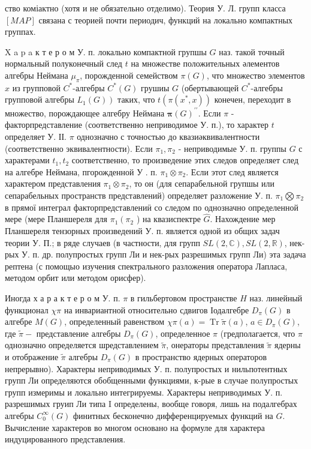 \documentclass[10pt]{article}
\begin{document}
ство коміактно (хотя и не обязательно отделимо). Теория У. Л. групп класса $[M A P]$ связана с теорией почти периодич, функций на локально компактных группах.



$\mathrm{X}$ a p a к т е р о м У. п. локально компактной групшы $G$ наз. такой точный нормальный полуконечный след $t$ на множестве положительных әлементов алгебры Неймана $\mu_{\pi}$, порожденной семейством $\pi(G)$, что множество элементов $x$ из групповой $C^{*}$-алгебры $C^{*}(G)$ грушиы $G$ (обертывающей $C^{*}$-алгебры групповой алгебры $\left.L_{1}(G)\right)$ таких, что $t\left(\pi\left(x^{*}, x\right)\right)$ конечен, переходит в множество, порождающее алгебру Неймана $\boldsymbol{\pi}(G)^{\prime \prime}$. Если $\pi$ - факторпредставление (соответственно неприводимое У. п.), то характер $t$ определяет У. ІІ. $\pi$ однозначно с точностью до квазиәквивалентности (соответственно эквивалентности). Если $\pi_{1}, \pi_{2}$ - неприводимые У. п. группы $G$ с характерами $t_{1}, t_{2}$ соответственно, то произведение этих следов определяет след на алгебре Неймана, пгорожденной У . п. $\pi_{1} \otimes \pi_{2}$. Если этот след является характером представления $\pi_{1} \otimes \pi_{2}$, то он (для сепарабельной групшы или сепарабельных пространств представлений) определяет разложение У. п. $\pi_{1} \bigotimes \pi_{2}$ в прямої интеграл факторпредставлениӥ со следом по однозначно определенной мере (мере Планшереля для $\pi_{1}\left(\pi_{2}\right.$ ) на квазиспектре $\hat{G}$. Нахождение мер Планшереля тензорных произведений У. п. является одной из общих задач теории У. П.; в ряде случаев (в частности, для групп $S L(2, \mathbb{C}), S L(2, \mathbb{R})$, нек-рых У. п. др. полупростых групп Ли и нек-рых разрешимых групп Ли) эта задача рептена (с помощыо изучения спектрального разложения оператора Лапласа, методом орбит или методом орисфер).



Иногда х а р а к т е р о м У. п. $\pi$ в гильбертовом пространстве $H$ наз. линейный функционал $\chi \pi$ на инвариантной относительно сдвигов Іодалгебре $D_{\pi}(G)$ в алгебре $M(G)$, определенный равенством $\chi \pi(a)=\operatorname{Tr} \tilde{\pi}(a)$, $a \in D_{\pi}(G)$, где $\tilde{\pi}-$ представление алгебры $D_{\pi}(G)$, определенное $\pi$ (гредполагается, что $\pi$ однозначно определяется шредставлением $\tilde{\pi}$, онераторы представления $\tilde{\pi}$ ядерны и отображение $\tilde{\pi}$ алгебры $D_{\pi}(G)$ в пространство ядерных операторов непрерывно). Характеры неприводимых У. п. полупростых и нильпотентных групп Ли определяются обобщенными функциями, к-рые в случае полупростых групп измеримы и локально интегрируемы. Характеры неприводимых У. п. разрешимых груип Ли типа I определены, вообще говоря, лишь на подалгебрах алгебры $C_{0}^{\infty}(G)$ финитных бесконечно дифференцируемых функций на $G$. Вычисление характеров во многом основано на формуле для характера индуцированного представления.
\end{document}
